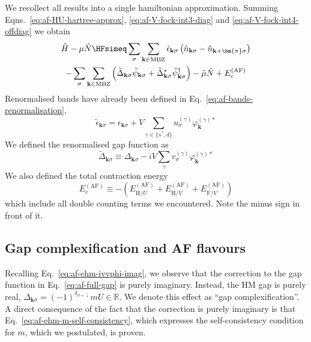 We recollect all results into a single hamiltonian approximation. Summing Eqns.~\eqref{eq:af-HU-hartree-approx}, \eqref{eq:af-V-fock-int3-diag} and \eqref{eq:af-V-fock-int4-offdiag} we obtain
\begin{multline}
	\hat H - \mu \hat N \HFsimeq \sum_\sigma \sum_{\mathbf{k}\in\mathrm{MBZ}} \tilde{\epsilon}_{\mathbf{k}\sigma} \left(
	\hat n_{\mathbf{k}\sigma} - \hat n_{\mathbf{k}+\bm{\pi}\sigma}
	\right) \\
	- \sum_\sigma \sum_{\mathbf{k}\in\mathrm{MBZ}} \left(
	\tilde{\Delta}_{\mathbf{k}\sigma}
	\hat \psi_{\mathbf{k}\sigma} + \tilde{\Delta}_{\mathbf{k}\sigma}^* \hat \psi_{\mathbf{k}\sigma}^\dagger
	\right)
	- \tilde{\mu} \hat N + E_\mathrm{c}^{(\mathrm{AF})} \label{eq:af-full-h}
\end{multline}
Renormalised bands have already been defined in Eq.~\eqref{eq:af-bands-renormalisation},
\[
	\tilde{\epsilon}_{\mathbf{k}\sigma} = \epsilon_{\mathbf{k}\sigma} + V \sum_{\gamma\in\lbrace s^*,d \rbrace} u^{(\gamma)}_\sigma \varphi_{\mathbf{k}}^{(\gamma)*}
\]
We defined the renormalised gap function as
\begin{equation}\label{eq:af-full-gap}
	\tilde{\Delta}_{\mathbf{k}\sigma} \equiv \Delta_{\mathbf{k}\sigma} - iV \sum_\gamma v^{(\gamma)}_\sigma \varphi_\mathbf{k}^{(\gamma)*}
\end{equation}
We also defined the total contraction energy
\begin{equation}\label{eq:af-Ec}
	E_\mathrm{c}^{(\mathrm{AF})} \equiv -
	\left( 
		E_{\mathrm{H}/U}^{(\mathrm{AF})} + 
		E_{\mathrm{H}/V}^{(\mathrm{AF})} + E_{\mathrm{F}/V}^{(\mathrm{AF})}
	\right)
\end{equation}
which include all double counting terms we encountered. Note the minus sign in front of it.

\subsection{Gap complexification and AF flavours}\label{subsec:af-gap-complexification}

Recalling Eq.~\eqref{eq:af-ehm-ivvphi-imag}, we observe that the correction to the gap function in Eq.~\eqref{eq:af-full-gap} is purely imaginary. Instead, the HM gap is purely real, $\Delta_{\mathbf{k}\sigma} = (-1)^{\delta_{\sigma=\downarrow}} mU \in \mathbb{R}$. We denote this effect as ``gap complexification''. A direct consequence of the fact that the correction is purely imaginary is that Eq.~\eqref{eq:af-ehm-m-self-consistency}, which expresses the self-consistency condition for $m$, which we postulated, is proven.

